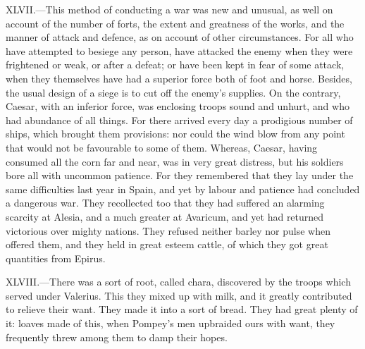 XLVII.—This method of conducting a war was new and unusual, as well on
account of the number of forts, the extent and greatness of the works,
and the manner of attack and defence, as on account of other
circumstances. For all who have attempted to besiege any person, have
attacked the enemy when they were frightened or weak, or after a defeat;
or have been kept in fear of some attack, when they themselves have had
a superior force both of foot and horse. Besides, the usual design of a
siege is to cut off the enemy's supplies. On the contrary, Caesar, with
an inferior force, was enclosing troops sound and unhurt, and who had
abundance of all things. For there arrived every day a prodigious number
of ships, which brought them provisions: nor could the wind blow from
any point that would not be favourable to some of them. Whereas, Caesar,
having consumed all the corn far and near, was in very great distress,
but his soldiers bore all with uncommon patience. For they remembered
that they lay under the same difficulties last year in Spain, and yet by
labour and patience had concluded a dangerous war. They recollected too
that they had suffered an alarming scarcity at Alesia, and a much
greater at Avaricum, and yet had returned victorious over mighty
nations. They refused neither barley nor pulse when offered them, and
they held in great esteem cattle, of which they got great quantities
from Epirus.

XLVIII.—There was a sort of root, called chara, discovered by the
troops which served under Valerius. This they mixed up with milk, and it
greatly contributed to relieve their want. They made it into a sort of
bread. They had great plenty of it: loaves made of this, when Pompey's
men upbraided ours with want, they frequently threw among them to damp
their hopes.

